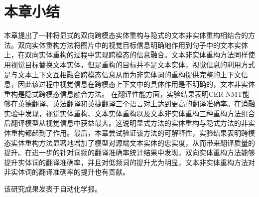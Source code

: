 \section{本章小结}
本章提出了一种将显式的双向跨模态实体重构与隐式的文本非实体重构相结合的方法。双向实体重构方法将图片中的视觉目标信息明确地作用到句子中的文本实体上，在双向实体重构的过程中实现跨模态的信息融合。文本非实体重构方法同样使用视觉目标替换文本实体，但是重构的目标并不是文本实体，视觉信息的利用方式是与文本上下文互相融合跨模态信息从而为非实体词的重构提供完整的上下文信息，因此该过程中视觉信息在跨模态上下文中的具体作用是不明确的，文本非实体重构是隐式跨模态信息融合方法。
在翻译性能方面，实验结果表明CER-NMT能够在英德翻译、英法翻译和英捷翻译三个语言对上达到更高的翻译准确率。在消融实验中发现，视觉实体重构、文本实体重构以及文本非实体重构三种重构方法组合后翻译模型从视觉信息中获益最大。这说明显式方法的实体重构与隐式方法的非实体重构都起到了作用。最后，本章尝试验证该方法的可解释性，实验结果表明跨模态实体重构方法显著地增加了模型对源端文本实体的忠实度，从而带来翻译质量的提升。在进一步的针对词频的翻译准确率统计结果中发现，双向实体重构方法能够提升实体词的翻译准确率，并且对低频词的提升尤为明显，文本非实体重构方法对非实体词的翻译准确率的提升也有贡献。

该研究成果发表于自动化学报。